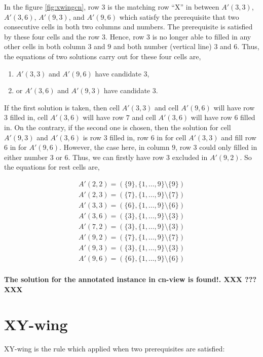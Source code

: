 \documentclass[11pt]{report}
\newcommand{\set}[1]{\{ #1 \}}
\begin{document}
In the figure \ref{fig:xwingcn}, row $3$ is the matching row ``X'' in between $A'(3,3)$, $A'(3,6)$, $A'(9,3)$, and $A'(9,6)$ which satisfy the prerequisite that two consecutive cells in both two columns and numbers. The prerequisite is satisfied by these four cells and the row $3$. Hence, row $3$ is no longer able to filled in any other cells in both column $3$ and $9$ and both number (vertical line) $3$ and $6$. Thus, the equations of two solutions carry out for these four cells are,

\begin{enumerate}
\item $A'(3,3)$ and $A'(9,6)$ have candidate $3$,
\item or $A'(3,6)$ and $A'(9,3)$ have candidate $3$.
\end{enumerate}

If the first solution is taken, then cell $A'(3,3)$ and cell $A'(9,6)$ will have row $3$ filled in, cell $A'(3,6)$ will have row $7$ and cell $A'(3,6)$ will have row $6$ filled in. On the contrary, if the second one is chosen, then the solution for cell $A'(9,3)$ and $A'(3,6)$ is row $3$ filled in, row $6$ in for cell $A'(3,3)$ and fill row $6$ in for $A'(9,6)$. However, the case here, in column $9$, row $3$ could only filled in either number $3$ or $6$. Thus, we can firstly have row $3$ excluded in $A'(9,2)$. So the equations for rest cells are,

\begin{eqnarray*}
A'(2,2) = (\set{9}, \set{1, \dots, 9} \setminus \set{9})\\
A'(2,3) = (\set{7}, \set{1, \dots, 9} \setminus \set{7})\\
A'(3,3) = (\set{6}, \set{1, \dots, 9} \setminus \set{6})\\
A'(3,6) = (\set{3}, \set{1, \dots, 9} \setminus \set{3})\\
A'(7,2) = (\set{3}, \set{1, \dots, 9} \setminus \set{3})\\
A'(9,2) = (\set{7}, \set{1, \dots, 9} \setminus \set{7})\\
A'(9,3) = (\set{3}, \set{1, \dots, 9} \setminus \set{3})\\
A'(9,6) = (\set{6}, \set{1, \dots, 9} \setminus \set{6})\\
\end{eqnarray*}

\textbf{The solution for the annotated instance in cn-view is found!. XXX ??? XXX}



\section{XY-wing}
\label{sec:XY-wing}
XY-wing is the rule which applied when two prerequisites are satisfied:
\end{document}
